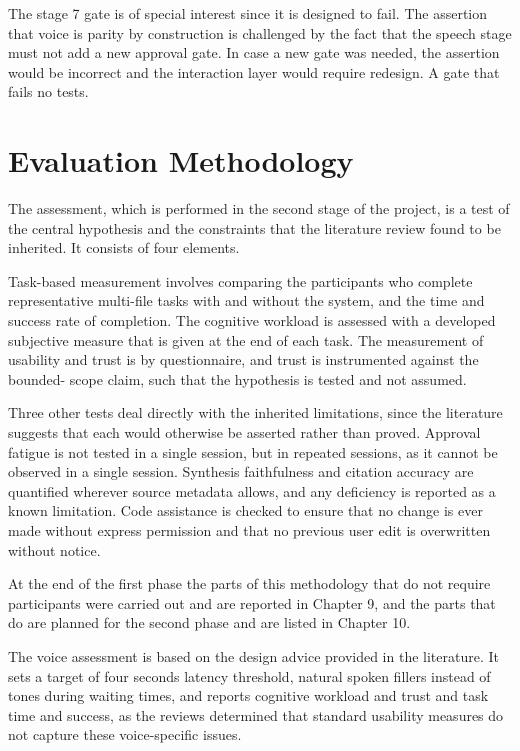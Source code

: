 \documentclass{FastFyp}
\begin{document}
The stage 7 gate is of special interest since it is designed to fail. The assertion that voice is parity by construction is challenged by the fact that the speech stage must not add a new approval gate. In case a new gate was needed, the assertion would be incorrect and the interaction layer would require redesign. A gate that fails no tests.

\section{Evaluation Methodology}
The assessment, which is performed in the second stage of the project, is a test of the central hypothesis and the constraints that the literature review found to be inherited. It consists of four elements.

Task-based measurement involves comparing the participants who complete representative multi-file tasks with and without the system, and the time and success rate of completion. The cognitive workload is assessed with a developed subjective measure that is given at the end of each task. The measurement of usability and trust is by questionnaire, and trust is instrumented against the bounded- scope claim, such that the hypothesis is tested and not assumed.

Three other tests deal directly with the inherited limitations, since the literature suggests that each would otherwise be asserted rather than proved. Approval fatigue is not tested in a single session, but in repeated sessions, as it cannot be observed in a single session. Synthesis faithfulness and citation accuracy are quantified wherever source metadata allows, and any deficiency is reported as a known limitation. Code assistance is checked to ensure that no change is ever made without express permission and that no previous user edit is overwritten without notice.

At the end of the first phase the parts of this methodology that do not require participants were carried out and are reported in Chapter 9, and the parts that do are planned for the second phase and are listed in Chapter 10.

The voice assessment is based on the design advice provided in the literature. It sets a target of four seconds latency threshold, natural spoken fillers instead of tones during waiting times, and reports cognitive workload and trust and task time and success, as the reviews determined that standard usability measures do not capture these voice-specific issues.
\end{document}
